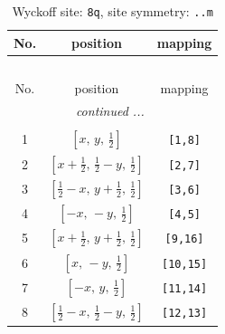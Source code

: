 \documentclass[fleqn,8pt]{jsarticle}
\begin{document}
\begin{longtable}{ccc}
\caption{Wyckoff site: {\tt 8q}, site symmetry: {\tt ..m}}
 \\
 \hline \hline
No. & position & mapping \\ \hline \endfirsthead

\multicolumn{2}{l}{\tablename\ \thetable{}} \\
 \hline \hline
No. & position & mapping \\ \hline \endhead

 \hline \hline
\multicolumn{2}{r}{\footnotesize\it continued ...} \\ \endfoot

 \hline \hline
\multicolumn{2}{r}{} \\ \endlastfoot

1 & $\left[ x,\, y,\, \frac{1}{2} \right]$ & {\tt [1,8]} \\ \hline
2 & $\left[ x + \frac{1}{2},\, \frac{1}{2} - y,\, \frac{1}{2} \right]$ & {\tt [2,7]} \\ \hline
3 & $\left[ \frac{1}{2} - x,\, y + \frac{1}{2},\, \frac{1}{2} \right]$ & {\tt [3,6]} \\ \hline
4 & $\left[ - x,\, - y,\, \frac{1}{2} \right]$ & {\tt [4,5]} \\ \hline
5 & $\left[ x + \frac{1}{2},\, y + \frac{1}{2},\, \frac{1}{2} \right]$ & {\tt [9,16]} \\ \hline
6 & $\left[ x,\, - y,\, \frac{1}{2} \right]$ & {\tt [10,15]} \\ \hline
7 & $\left[ - x,\, y,\, \frac{1}{2} \right]$ & {\tt [11,14]} \\ \hline
8 & $\left[ \frac{1}{2} - x,\, \frac{1}{2} - y,\, \frac{1}{2} \right]$ & {\tt [12,13]} \\
\end{longtable}
\renewcommand{\arraystretch}{1.2}
\end{document}
